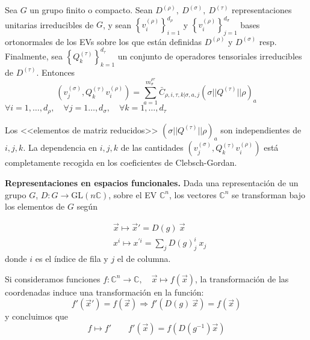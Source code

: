 \begin{teorema} 
Sea $G$ un grupo finito o compacto. Sean $D^{(\rho)},\ D^{(\sigma)},\ D^{(\tau)}$ representaciones unitarias irreducibles de $G$, y sean $\left\{v_i^{(\rho)}\right\}_{i=1}^{d_\rho}$ y $\left\{v_i^{(\rho)}\right\}_{j=1}^{d_\sigma}$ bases ortonormales de los EVs sobre los que están definidas $D^{(\rho)}$ y $D^{(\sigma)}$ resp. Finalmente, sea $\left\{Q_k^{(\tau)}\right\}_{k=1}^{d_\tau}$ un conjunto de operadores tensoriales irreducibles de $D^{(\tau)}$. Entonces
\begin{equation}
\left(v_j^{(\sigma)},Q_k^{(\tau)}v_i^{(\rho)}\right)=\sum_{a=1}^{m_{\sigma}^{\rho\tau}} \bar{C}_{\rho,i,\tau,k|\sigma,a,j}\left(\sigma||Q^{(\tau)}||\rho		\right)_a%
\end{equation}
$\forall i=1,\ldots,d_\rho,\quad \forall j=1\ldots,d_\sigma,\quad \forall k=1,\ldots,d_\tau$\medskip

Los <<elementos de matriz reducidos>> $\left(\sigma||Q^{(\tau)}||\rho		\right)_a$ son independientes de $i,j,k$. La dependencia en $i,j,k$ de las cantidades $ \left(v_j^{(\sigma)},Q_k^{(\tau)}v_i^{(\rho)}\right)$ está completamente recogida en los coeficientes de Clebsch-Gordan.
\end{teorema}


\begin{flushleft}
\textbf{Representaciones en espacios funcionales.} Dada una representación de un grupo $G$, $D:G\rightarrow \mathrm{GL}(n\mathbb{C})$, sobre el EV $\mathbb{C}^n$, los vectores $\mathbb{C}^n$ se transforman bajo los elementos de $G$ según
\end{flushleft}

\begin{subequations}
\begin{flalign}
& \vec{x}\longmapsto \vec{x}'=D(g)\ \vec{x}\\
& x^i\longmapsto x^{\prime i}=\sum_j D(g)^i_j\ x_j
\end{flalign}
\end{subequations}
donde $i$ es el índice de fila y $j$ el de columna. \medskip

Si consideramos funciones $f:\mathbb{C}^n\longrightarrow \mathbb{C},\quad
\vec{x}\longmapsto f(\vec{x})$, la transformación de las coordenadas induce una transformación en la función:
\begin{equation}
f'(\vec{x}')=f(\vec{x})\Longrightarrow f'(D(g)\ \vec{x})=f(\vec{x})
\end{equation}
y concluimos que
\begin{equation}
f \mapsto f'\qquad \boxed{f'(\vec{x})=f\left(D(g^{-1})\vec{x}\right)}
\end{equation}
